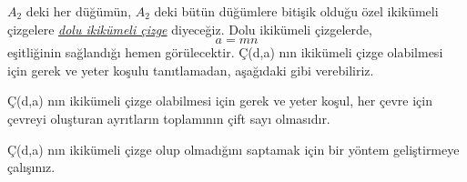 \documentclass[11pt]{amsbook}
\begin{document}

    $A_2$ deki her düğümün, $A_2$ deki bütün düğümlere bitişik olduğu özel ikikümeli çizgelere \emph{\underline{dolu ikikümeli çizge}} diyeceğiz. Dolu ikikümeli çizgelerde, 
		\[
		a = mn
	\]
	eşitliğinin sağlandığı hemen görülecektir. Ç(d,a) nın ikikümeli çizge olabilmesi için gerek ve yeter koşulu tanıtlamadan, aşağıdaki gibi verebiliriz. 
	
	\begin{theorem}
Ç(d,a) nın ikikümeli çizge olabilmesi için gerek ve yeter koşul, her çevre için çevreyi oluşturan ayrıtların toplamının çift sayı olmasıdır. 

\end{theorem}
Ç(d,a) nın ikikümeli çizge olup olmadığını saptamak için bir yöntem geliştirmeye çalışınız.
\end{document}
